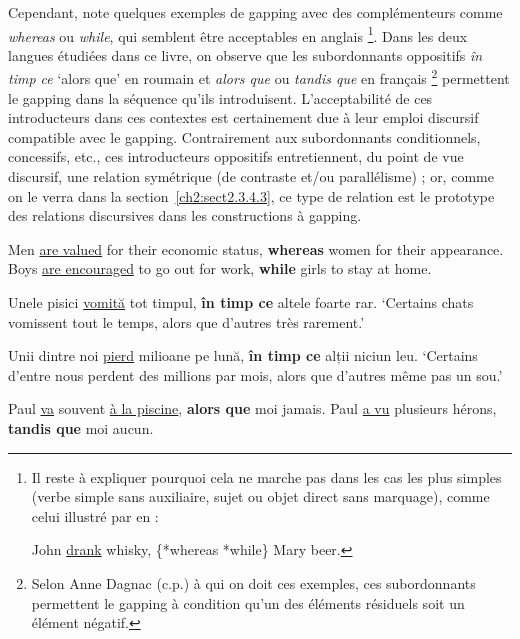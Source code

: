 Cependant, \citet{Izutsu2008} note quelques exemples de gapping avec des complémenteurs comme \textit{whereas} ou\textit{ while}, qui semblent être acceptables en anglais \footnote{
 Il reste à expliquer pourquoi cela ne marche pas dans les cas les plus simples (verbe simple sans auxiliaire, sujet ou objet direct sans marquage), comme celui illustré par \citet{CulicoverEtAl2005} en  :
 
 \ea \label{ch2:foot16exi}
 John \uline{drank} whisky, \{*whereas {\textbar} *while\} Mary beer. 
 \zlast
}. Dans les deux langues étudiées dans ce livre, on observe que les subordonnants oppositifs \textit{în timp ce} ‘alors que’ en roumain  et\textit{ alors que} ou \textit{tandis que} en français \footnote{
 Selon Anne Dagnac (c.p.) à qui on doit ces exemples, ces subordonnants permettent le gapping à condition qu’un des éléments résiduels soit un élément négatif.} permettent le gapping dans la séquence qu’ils introduisent. L’acceptabilité de ces introducteurs dans ces contextes est certainement due à leur emploi discursif compatible avec le gapping. Contrairement aux subordonnants conditionnels, concessifs, etc., ces introducteurs oppositifs entretiennent, du point de vue discursif, une relation symétrique (de contraste et/ou parallélisme) ; or, comme on le verra dans la section~\ref{ch2:sect2.3.4.3}, ce type de relation est le prototype des relations discursives dans les constructions à gapping. 

\ea \label{ch2:ex37}
\ea  Men \uline{are valued} for their economic status, \textbf{whereas} women for their appearance. \citep[654]{Izutsu2008} 
\ex Boys \uline{are encouraged} to go out for work, \textbf{while} girls to stay at home. 
\z
\z

\ea \label{ch2:ex38}
\ea Unele pisici \uline{vomită} tot timpul, \textbf{în timp ce} altele foarte rar.
\glt  ‘Certains chats vomissent tout le temps, alors que d’autres très rarement.’   

\ex  Unii dintre noi \uline{pierd} milioane pe lună, \textbf{în timp ce} alții niciun leu.
\glt  ‘Certains d’entre nous perdent des millions par mois, alors que d’autres même pas un sou.’ 
\z
\z

\ea \label{ch2:ex39}
\ea  Paul \uline{va} souvent \uline{à la piscine}, \textbf{alors que} moi jamais.
\ex Paul \uline{a vu} plusieurs hérons, \textbf{tandis que} moi aucun.    
\z
\z

